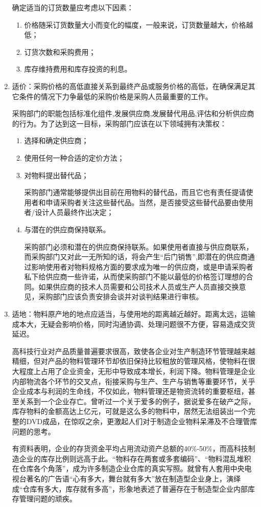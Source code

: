 \begin{enumerate}
    确定适当的订货数量应考虑以下因素：
        \begin{enumerate}
            \item  价格随采订货数量大小而变化的幅度，一般来说，订货数量越大，价格越低；
            \item  订货次数和采购费用；
            \item  库存维持费用和库存投资的利息。
        \end{enumerate}

    \item  适价：采购价格的高低直接关系到最终产品或服务价格的高低，在确保满足其它条件的情况下力争最低的采购价格是采购人员最重要的工作。

    采购部门的职能包括标准化组件,发展供应商,发展替代用品,评估和分析供应商的行为。为了达到这一目标，采购部门应该在以下领域拥有决策权：
        \begin{enumerate}
            \item  选择和确定供应商；
            \item  使用任何一种合适的定价方法；
            \item  对物料提出替代品；

            采购部门通常能够提供出目前在用物料的替代品，而且它也有责任提请使用者和申请采购者关注这些替代品。当然，是否接受这些替代品要由使用者/设计人员最终作出决定；
            \item  与潜在的供应商保持联系。

            采购部门必须和潜在的供应商保持联系。如果使用者直接与供应商联系，而采购部门又对此一无所知的话，将会产生“后门销售”,即潜在的供应商通过影响使用者对物料规格方面的要求成为唯一的供应商，或是申请采购者私下给供应商一些许诺，从而使采购部门不能以最低的价格签订理想的合同。如果供应商的技术人员需要和公司技术人员或生产人员直接交换意见，采购部门应该负责安排会谈并对谈判结果进行审核。
        \end{enumerate}

    \item  适地：物料原产地的地点应适当，与使用地的距离越近越好。距离太远，运输成本大，无疑会影响价格，同时沟通协调、处理问题很不方便，容易造成交货延迟。

    高科技行业对产品质量普遍要求很高，致使各企业对生产制造环节管理越来越精细，但对产品的物料管理环节却依旧保持比较粗放的管理风格，使物料在很大程度上占用了企业资金，无形中导致成本增长，利润下降。物料管理是企业内部物流各个环节的交叉点，衔接采购与生产、生产与销售等重要环节，关乎企业成本与利润的生命线，不仅如此，物料管理还是物资流转的重要枢纽，甚至关系到一个企业存亡。曾听过一个关于爱多的例子，据说爱多在破产之际，库存物料的金额高达上亿元，可就是这么多的物料中，居然无法组装出一个完整的DVD成品，在惊叹之余，更激起人们对于制造企业物料呆滞及不合理管库问题的思考。

    有资料表明，企业的存货资金平均占用流动资产总额的40\%-50\%，而高科技制造企业的库存比例则远高于此。“物料存在两套或多套编码”、“物料混乱堆积在仓库各个角落”，成为许多制造企业仓库的真实写照。就曾有人套用中央电视台著名的广告语“心有多大，舞台就有多大”放在制造型企业身上，演绎成“仓库有多大，库存就有多高”，形象地表述了普遍存在于制造型企业内部库存管理问题的顽疾。

    \end{enumerate}

